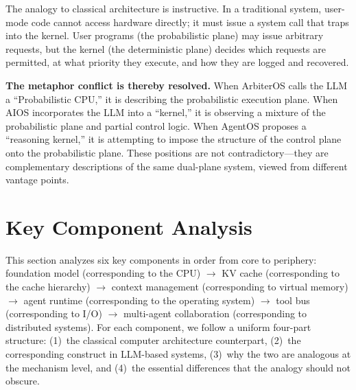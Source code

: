 \documentclass[11pt,a4paper]{article}
\begin{document}
The analogy to classical architecture is instructive.
In a traditional system, user-mode code cannot access hardware directly; it must issue a system call that traps into the kernel\cite{ostep_2023}.
User programs (the probabilistic plane) may issue arbitrary requests, but the kernel (the deterministic plane) decides which requests are permitted, at what priority they execute, and how they are logged and recovered.

\textbf{The metaphor conflict is thereby resolved.}
When ArbiterOS calls the LLM a ``Probabilistic CPU,'' it is describing the probabilistic execution plane.
When AIOS incorporates the LLM into a ``kernel,'' it is observing a mixture of the probabilistic plane and partial control logic.
When AgentOS proposes a ``reasoning kernel,'' it is attempting to impose the structure of the control plane onto the probabilistic plane.
These positions are not contradictory---they are complementary descriptions of the same dual-plane system, viewed from different vantage points.




\section{Key Component Analysis}
\label{sec:components}

This section analyzes six key components in order from core to periphery:
foundation model (corresponding to the CPU) $\to$ KV cache (corresponding to the cache hierarchy) $\to$ context management (corresponding to virtual memory) $\to$ agent runtime (corresponding to the operating system) $\to$ tool bus (corresponding to I/O) $\to$ multi-agent collaboration (corresponding to distributed systems).
For each component, we follow a uniform four-part structure: (1)~the classical computer architecture counterpart, (2)~the corresponding construct in LLM-based systems, (3)~why the two are analogous at the mechanism level, and (4)~the essential differences that the analogy should not obscure.
\end{document}
